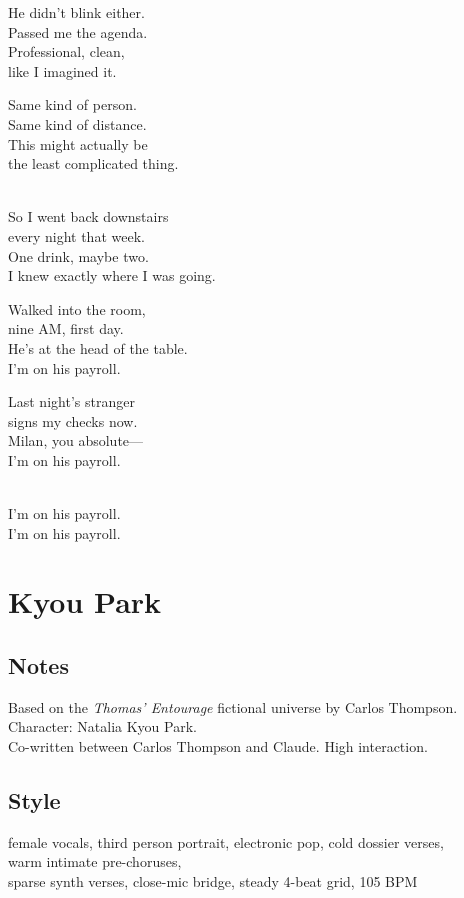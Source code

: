 \begin{lyrics}
He didn't blink either.\\
Passed me the agenda.\\
Professional, clean,\\
like I imagined it.

Same kind of person.\\
Same kind of distance.\\
This might actually be\\
the least complicated thing.

\\
So I went back downstairs\\
every night that week.\\
One drink, maybe two.\\
I knew exactly where I was going.

Walked into the room,\\
nine AM, first day.\\
He's at the head of the table.\\
I'm on his payroll.

Last night's stranger\\
signs my checks now.\\
Milan, you absolute—\\
I'm on his payroll.

\\
I'm on his payroll.\\
I'm on his payroll.

\end{lyrics}

\section{Kyou Park}

\subsection{Notes}
Based on the \emph{Thomas' Entourage} fictional universe by Carlos Thompson.\\
Character: Natalia Kyou Park.\\
Co-written between Carlos Thompson and Claude. High interaction.

\subsection{Style}
female vocals, third person portrait, electronic pop, cold dossier verses,\\
warm intimate pre-choruses,\\
sparse synth verses, close-mic bridge, steady 4-beat grid, 105 BPM


